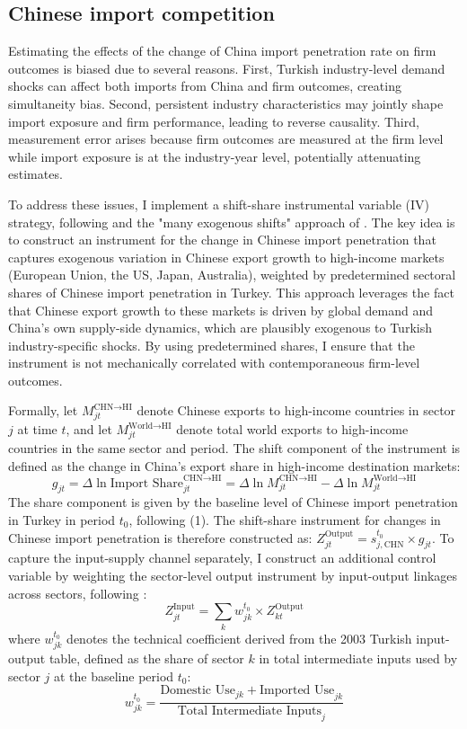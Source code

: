 \documentclass[12pt]{article}
\begin{document}
\subsection{Chinese import competition}

Estimating the effects of the change of China import penetration rate on firm outcomes is biased due to several reasons. First, Turkish industry-level demand shocks can affect both imports from China and firm outcomes, creating simultaneity bias. Second, persistent industry characteristics may jointly shape import exposure and firm performance, leading to reverse causality. Third, measurement error arises because firm outcomes are measured at the firm level while import exposure is at the industry-year level, potentially attenuating estimates.

To address these issues, I implement a shift-share instrumental variable (IV) strategy, following \textcite{autorTradeAdjustmentWorkerLevel2014} and the "many exogenous shifts" approach of \textcite{borusyakQuasiExperimentalShiftShareResearch2022}. The key idea is to construct an instrument for the change in Chinese import penetration that captures exogenous variation in Chinese export growth to high-income markets (European Union, the US, Japan, Australia), weighted by predetermined sectoral shares of Chinese import penetration in Turkey. This approach leverages the fact that Chinese export growth to these markets is driven by global demand and China's own supply-side dynamics, which are plausibly exogenous to Turkish industry-specific shocks. By using predetermined shares, I ensure that the instrument is not mechanically correlated with contemporaneous firm-level outcomes. 

Formally, let $M_{jt}^{\text{CHN} \to \text{HI}}$ denote Chinese exports to high-income countries in sector $j$ at time $t$, and let $M_{jt}^{\text{World} \to \text{HI}}$ denote total world exports to high-income countries in the same sector and period. The shift component of the instrument is defined as the change in China’s export share in high-income destination markets:
\[
g_{jt} = \Delta \ln \text{Import Share}_{jt}^{\text{CHN} \to \text{HI}} = \Delta \ln M_{jt}^{\text{CHN} \to \text{HI}} - \Delta \ln M_{jt}^{\text{World} \to \text{HI}}
\]
The share component is given by the baseline level of Chinese import penetration in Turkey in period $t_0$, following (1). The shift-share instrument for changes in Chinese import penetration is therefore constructed as: $Z_{jt}^{\text{Output}} = s_{j,\text{CHN}}^{t_0} \times g_{jt}$. To capture the input-supply channel separately, I construct an additional control variable by weighting the sector-level output instrument by input-output linkages across sectors, following \textcite{amitiTradeLiberalizationIntermediate2007}:
\[
Z_{jt}^{\text{Input}} = \sum_k w_{jk}^{t_0} \times Z_{kt}^{\text{Output}}
\]
where $w_{jk}^{t_0}$ denotes the technical coefficient derived from the 2003 Turkish input-output table, defined as the share of sector $k$ in total intermediate inputs used by sector $j$ at the baseline period $t_0$:
\[
w_{jk}^{t_0} = \frac{\text{Domestic Use}_{jk} + \text{Imported Use}_{jk}}{\text{Total Intermediate Inputs}_j}
\]
\end{document}

